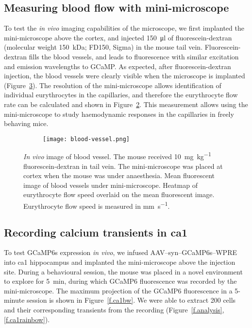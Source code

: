 \subsection{Measuring blood flow with mini-microscope}
To test the \textit{in vivo} imaging capabilities of the microscope, we first implanted the mini-microscope above the cortex, and injected \SI{150}{\ul} of fluorescein-dextran (molecular weight \SI{150}{\kilo\dalton}; FD150, Sigma) in the mouse tail vein. Fluorescein-dextran fills the blood vessels, and leads to fluorescence with similar excitation and emission wavelengths to GCaMP. As expected, after fluorescein-dextran injection, the blood vessels were clearly visible when the microscope is implanted (Figure~\ref{f.bloodvessel}). The resolution of the mini-microscope allows identification of individual eurythrocytes in the capillaries, and therefore the eurythrocyte flow rate can be calculated and shown in Figure~\ref{fig.sub.vel}. This measurement allows using the mini-microscope to study haemodynamic responses in the capillaries in freely behaving mice. 
\begin{figure}[h]
    \begin{subfigure}[h]{.5\linewidth}
        \centering
        \texttt{[image: blood-vessel.png]}
        \caption{\label{fig.sub.bv}}
    \end{subfigure}
    \begin{subfigure}[h]{.5\linewidth}
        
        \caption{\label{fig.sub.vel}}
    \end{subfigure}
    \caption[\textit{In vivo} image of blood vessels.]{\textit{In vivo} image of blood vessel. The mouse received \SI{10}{\mg\per\kg} fluorescein-dextran in tail vein. The mini-microscope was placed at cortex when the mouse was under anaesthesia.  Mean fluorescent image of blood vessels under mini-microscope.  Heatmap of eurythrocyte flow speed overlaid on the mean fluorescent image. Eurythrocyte flow speed is measured in \si{\mm\per\second}. \label{f.bloodvessel}}
\end{figure}


\subsection{Recording calcium transients in \gls{ca1}}
To test GCaMP6s expression \textit{in vivo}, we infused AAV--syn--GCaMP6s--WPRE into \gls{ca1} hippocampus and implanted the mini-microscope above the injection site. During a behavioural session, the mouse was placed in a novel environment to explore for \SI{5}{\minute}, during which GCaMP6 fluorescence was recorded by the mini-microscope. The maximum projection of the GCaMP6 fluorescence in a 5-minute session is shown in Figure~\ref{f.ca1bw}. We were able to extract 200 cells and their corresponding  transients from the recording (Figure~\ref{f.analysis}, \ref{f.ca1rainbow}).

